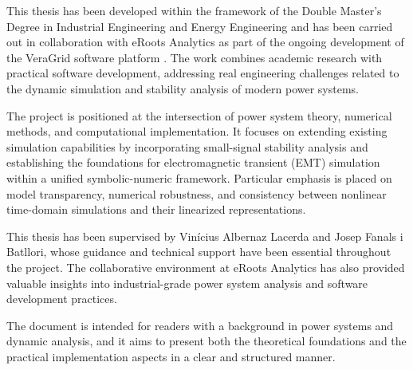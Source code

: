 

This thesis has been developed within the framework of the Double Master's Degree in
Industrial Engineering and Energy Engineering and has been carried out in collaboration
with eRoots Analytics as part of the ongoing development of the VeraGrid software
platform \cite{veragrid}. The work combines academic research with practical software development,
addressing real engineering challenges related to the dynamic simulation and stability
analysis of modern power systems.

The project is positioned at the intersection of power system theory, numerical methods,
and computational implementation. It focuses on extending existing simulation
capabilities by incorporating small-signal stability analysis and establishing the
foundations for electromagnetic transient (EMT) simulation within a unified symbolic-numeric framework. 
Particular emphasis is placed on model transparency, numerical
robustness, and consistency between nonlinear time-domain simulations and their
linearized representations.

This thesis has been supervised by Vinícius Albernaz Lacerda and Josep Fanals i Batllori,
whose guidance and technical support have been essential throughout the project. The
collaborative environment at eRoots Analytics has also provided valuable insights into
industrial-grade power system analysis and software development practices.

The document is intended for readers with a background in power systems and dynamic
analysis, and it aims to present both the theoretical foundations and the practical
implementation aspects in a clear and structured manner.
